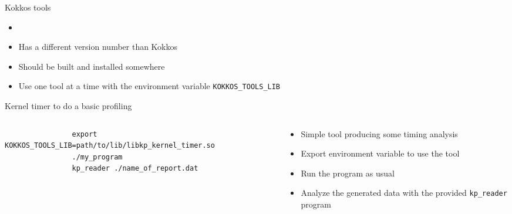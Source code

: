 \documentclass[
    aspectratio=169,
    handout,
]{beamer}
\begin{document}

\begin{frame}{Kokkos tools}
    \begin{itemize}
        \item {}
        \item Has a different version number than Kokkos
        \item Should be built and installed somewhere
        \item Use one tool at a time with the environment variable \texttt{KOKKOS\_TOOLS\_LIB}
    \end{itemize}
\end{frame}


\begin{frame}[fragile]{Kernel timer to do a basic profiling}
    \begin{columns}
        \begin{column}{0.6\linewidth}
            \begin{verbatim}
                export KOKKOS_TOOLS_LIB=path/to/lib/libkp_kernel_timer.so
                ./my_program
                kp_reader ./name_of_report.dat
            \end{verbatim}
        \end{column}
        \begin{column}{0.4\linewidth}
            \begin{itemize}
                \item Simple tool producing some timing analysis
                \item Export environment variable to use the tool
                \item Run the program as usual
                \item Analyze the generated data with the provided \texttt{kp\_reader} program
            \end{itemize}
        \end{column}
    \end{columns}
\end{frame}

\end{document}
